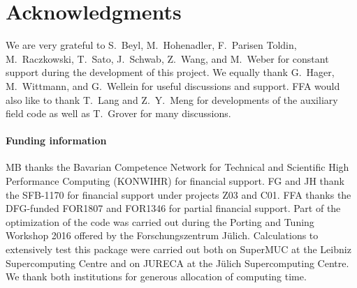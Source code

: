 \documentclass{SciPost}
\begin{document}
\section*{Acknowledgments} 
%
We are very grateful to  S.~Beyl, M.~Hohenadler,  F.~Parisen Toldin,  M.~Raczkowski, T.~Sato, J.~Schwab, Z.~Wang, and M.~Weber  for constant support during the development of this project. We equally thank G.~Hager, M.~Wittmann, and G.~Wellein for useful discussions and support.
FFA would also like to thank T.~Lang   and Z.~Y.~Meng for  developments of the auxiliary field code as well as T.~Grover for many discussions. 
\paragraph{Funding information}
MB thanks the Bavarian Competence Network for Technical and Scientific High Performance Computing (KONWIHR) for financial support. FG  and JH thank the SFB-1170 for  financial support under projects Z03 and C01.  FFA thanks the DFG-funded FOR1807 and FOR1346 for partial financial support.
Part of the optimization of the code was carried out during  the  Porting and Tuning Workshop 2016 offered by the Forschungszentrum J\"ulich.
Calculations  to extensively test this package were carried out both on  SuperMUC at the  Leibniz Supercomputing Centre and on  JURECA  \cite{Jureca16} at the J\"ulich Supercomputing Centre.  We thank both institutions for generous allocation of computing time. 
\end{document}
